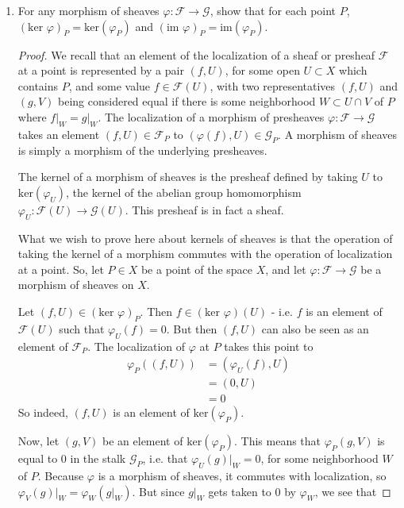 \documentclass[12pt]{article}
\theoremstyle{definition}
\newenvironment{problem}[2][Problem]{\begin{trivlist}
\item[\hskip \labelsep {\bfseries #1}\hskip \labelsep {\bfseries #2.}]}{\end{trivlist}}
\begin{document}
\begin{problem}{2}
    \begin{enumerate}[label=(\alph*)]
        \item For any morphism of sheaves $\varphi: \mathcal F \to \mathcal G$, show that for each point $P$, $(\text{ker }\varphi)_P = \text{ker}(\varphi_P)$ and $(\text{im }\varphi)_P = \text{im}(\varphi_P)$.
        \begin{proof}
            We recall that an element of the localization of a sheaf or presheaf $\mathcal F$ at a point is represented by a pair $(f,U)$, for some open $U \subset X$ which contains $P$, and some value $f \in \mathcal F(U)$, with two representatives $(f,U)$ and $(g,V)$ being considered equal if there is some neighborhood $W \subset U \cap V$ of $P$ where $f\lvert_W = g\lvert_W$. The localization of a morphism of presheaves $\varphi : \mathcal F \to \mathcal G$ takes an element $(f,U) \in \mathcal F_P$ to $(\varphi(f), U) \in \mathcal G_P$. A morphism of sheaves is simply a morphism of the underlying presheaves.
            \par The kernel of a morphism of sheaves is the presheaf defined by taking $U$ to $\text{ker}(\varphi_U)$, the kernel of the abelian group homomorphism $\varphi_U : \mathcal F(U) \to \mathcal G(U)$. This presheaf is in fact a sheaf.
            \par What we wish to prove here about kernels of sheaves is that the operation of taking the kernel of a morphism commutes with the operation of localization at a point. So, let $P \in X$ be a point of the space $X$, and let $\varphi: \mathcal F \to \mathcal G$ be a morphism of sheaves on $X$. 
            \par Let $(f, U) \in (\text{ker }\varphi)_P$. Then $f \in (\text{ker } \varphi)(U)$ - i.e. $f$ is an element of $\mathcal F(U)$ such that $\varphi_U(f) = 0$. But then $(f,U)$ can also be seen as an element of $\mathcal F_P$. The localization of $\varphi$ at $P$ takes this point to 
            \begin{align*}
            \varphi_P((f,U)) &= (\varphi_U(f) ,U)\\
            &= (0,U)\\ 
            &= 0
            \end{align*}
            So indeed, $(f,U)$ is an element of $\text{ker}(\varphi_P)$.
            \par Now, let $(g,V)$ be an element of $\text{ker}(\varphi_P)$. This means that $\varphi_P(g,V)$ is equal to $0$ in the stalk $\mathcal G_P$, i.e. that $\varphi_U(g)\lvert_W = 0$, for some neighborhood $W$ of $P$. Because $\varphi$ is a morphism of sheaves, it commutes with localization, so $\varphi_V(g)\lvert_W = \varphi_W(g\lvert_W)$. But since $g \lvert_W$ gets taken to $0$ by $\varphi_W$, we see that

\end{proof}
\end{enumerate}
\end{problem}
\end{document}
